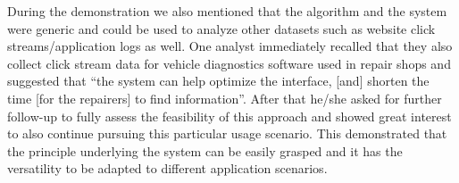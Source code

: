During the demonstration we also mentioned that the algorithm and the system were generic and could be used to analyze other datasets such as website click streams/application logs as well. One analyst immediately recalled that they also collect click stream data for vehicle diagnostics software used in repair shops and suggested that ``the system can help optimize the interface, [and] shorten the time [for the repairers] to find information''. After that he/she asked for further follow-up to fully assess the feasibility of this approach and showed great interest to also continue pursuing this particular usage scenario. This demonstrated that the principle underlying the system can be easily grasped and it has the versatility to be adapted to different application scenarios.

